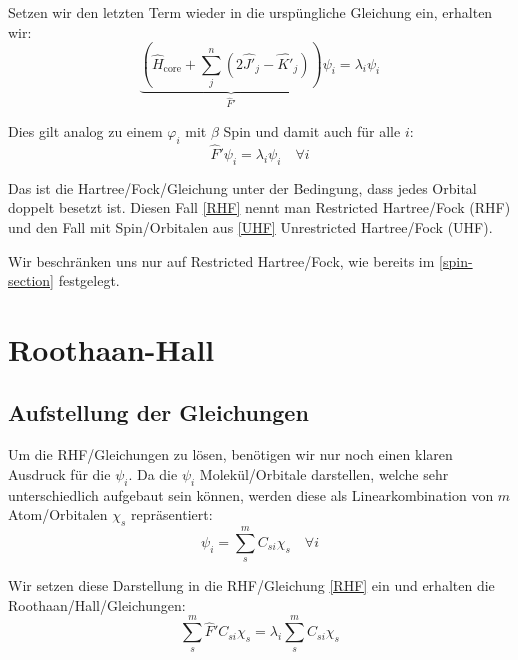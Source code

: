 Setzen wir den letzten Term wieder in die urspüngliche Gleichung ein, erhalten wir:
\begin{equation}
  \underbrace{\left( \hat{H}_{\text{core}} + \sum_j^{n}
  \left( 2\hat{J'}_j - \hat{K'}_j \right) \right)}_{\hat{F}'} \psi_i 
  = \lambda_i \psi_i
\end{equation}

Dies gilt analog zu einem $\varphi_i$ mit $\beta$ Spin und damit auch für alle $i$:
\begin{equation}\label{RHF}
  \hat{F}' \psi_i = \lambda_i \psi_i\quad \forall i
\end{equation}

Das ist die Hartree\-/Fock\-/Gleichung unter der Bedingung, dass jedes Orbital doppelt besetzt ist.
Diesen Fall \cref{RHF} nennt man Restricted Hartree\-/Fock (RHF) und
den Fall mit Spin\-/Orbitalen aus \cref{UHF} Unrestricted Hartree\-/Fock (UHF).

Wir beschränken uns nur auf Restricted Hartree\-/Fock, wie bereits im \cref*{spin-section} festgelegt.

\cite[Ab. 3.4.1]{szabo_ostlund_1996}
\cite[Aufgabe 1]{tc2_spin}

\section{Roothaan-Hall}
\subsection{Aufstellung der Gleichungen}
Um die RHF\-/Gleichungen zu lösen, benötigen wir nur noch einen klaren Ausdruck für die $\psi_i$.
Da die $\psi_i$ Molekül\-/Orbitale darstellen, welche sehr unterschiedlich aufgebaut sein können,
werden diese als Linearkombination von $m$ Atom\-/Orbitalen $\chi_s$ repräsentiert:
\begin{equation}\label{lin-comb-atomorbitals}
  \psi_i = \sum_s^m C_{s i} \chi_s \quad \forall i 
\end{equation}

Wir setzen diese Darstellung in die RHF\-/Gleichung \cref{RHF} ein und
erhalten die Roothaan\-/Hall\-/Gleichungen:
\begin{equation}\label{roothaan_hall_eq}
  \sum_s^m \hat{F}' C_{s i} \chi_s = \lambda_i \sum_s^m C_{s i} \chi_s 
\end{equation}

